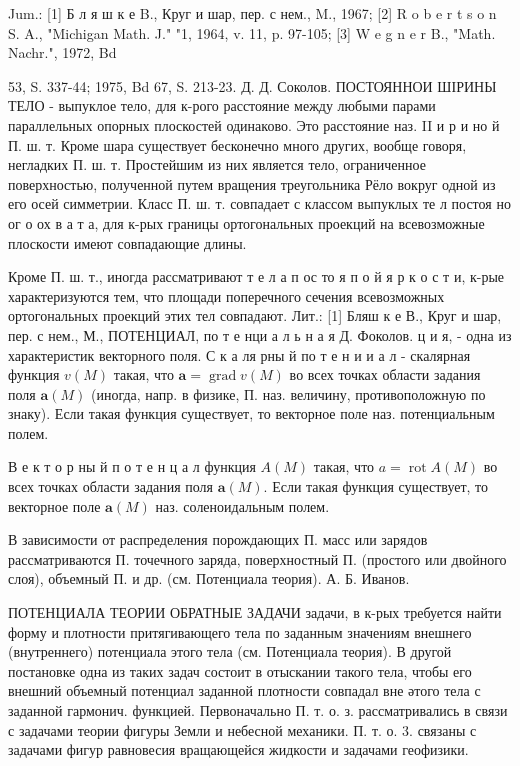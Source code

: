 \documentclass[10pt]{article}
\begin{document}
Jum.: [1] Б л я ш к е B., Круг и шар, пер. с нем., M., 1967; [2] R o b e r t s o n S. A., "Michigan Math. J." "1, 1964, v. 11, p. 97-105; [3] W e g n e r B., "Math. Nachr.", 1972, Bd

53, S. 337-44; 1975, Bd 67, S. 213-23. Д. Д. Соколов. ПОСТОЯННОИ ШІРИНЫ ТЕЛО - выпуклое тело, для к-рого расстояние между любыми парами параллельных опорных плоскостей одинаково. Это расстояние наз. II и р и но й П. ш. т. Кроме шара существует бесконечно много других, вообще говоря, негладких П. ш. т. Простейшим из них является тело, ограниченное поверхностью, полученной путем вращения треугольника Рёло вокруг одной из его осей симметрии. Класс П. ш. т. совпадает с классом выпуклых те л постоя но ог о ох в а т а, для к-рых границы ортогональных проекций на всевозможные плоскости имеют совпадающие длины.



Кроме П. ш. т., иногда рассматривают т е л а п ос то я п о й я р к о с т и, к-рые характеризуются тем, что площади поперечного сечения всевозможных ортогональных проекций этих тел совпадают. Лит.: [1] Бляш к е В., Круг и шар, пер. с нем., М., ПОТЕНЦИАЛ, по т е нци а л ь н а я Д. Фоколов. ц и я, - одна из характеристик векторного поля. С к а ля рны й по т е н и и а л - скалярная функция $v(M)$ такая, что $\boldsymbol{a}=\operatorname{grad} v(M)$ во всех точках области задания поля $\boldsymbol{a}(M)$ (иногда, напр. в физике, П. наз. величину, противоположную по знаку). Если такая функция существует, то векторное поле наз. потенциальным полем.



В е к т о р ны й п о т е н ц а л функция $A(M)$ такая, что $a=\operatorname{rot} A(M)$ во всех точках области задания поля $\boldsymbol{a}(M)$. Если такая функция существует, то векторное поле $\boldsymbol{a}(M)$ наз. соленоидальным полем.



В зависимости от распределения порождающих П. масс или зарядов рассматриваются П. точечного заряда, поверхностный П. (простого или двойного слоя), объемный П. и др. (см. Потенциала теория). А. Б. Иванов.



ПОТЕНЦИАЛА ТЕОРИИ ОБРАТНЫЕ ЗАДАЧИ задачи, в к-рых требуется найти форму и плотности притягивающего тела по заданным значениям внешнего (внутреннего) потенциала этого тела (см. Потенциала теория). В другой постановке одна из таких задач состоит в отыскании такого тела, чтобы его внешний объемный потенциал заданной плотности совпадал вне әтого тела с заданной гармонич. функцией. Первоначально П. т. о. з. рассматривались в связи с задачами теории фигуры Земли и небесной механики. П. т. о. 3. связаны с задачами фигур равновесия вращающейся жидкости и задачами геофизики.
\end{document}
